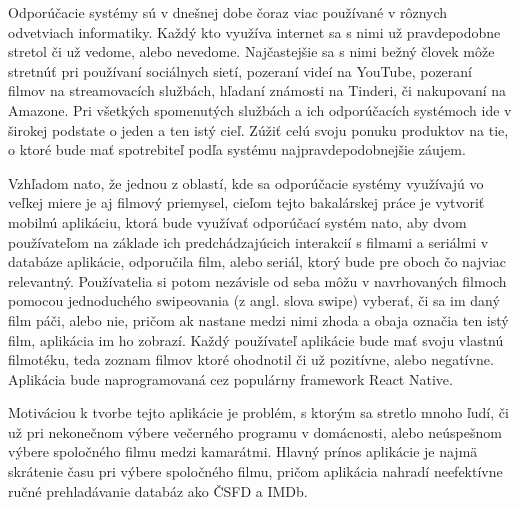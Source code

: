 
Odporúčacie systémy sú v dnešnej dobe čoraz viac používané v rôznych odvetviach informatiky. Každý kto využíva internet sa s nimi už pravdepodobne stretol či už vedome, alebo nevedome. Najčastejšie sa s nimi bežný človek môže stretnúť pri používaní sociálnych sietí, pozeraní videí na YouTube, pozeraní filmov na streamovacích službách, hľadaní známosti na Tinderi, či nakupovaní na Amazone. Pri všetkých spomenutých službách a ich odporúčacích systémoch ide v širokej podstate o jeden a ten istý cieľ. Zúžiť celú svoju ponuku produktov na tie, o ktoré bude mať spotrebiteľ podľa systému najpravdepodobnejšie záujem. \par
Vzhľadom nato, že jednou z oblastí, kde sa odporúčacie systémy využívajú vo veľkej miere je aj filmový priemysel, cieľom tejto bakalárskej práce je vytvoriť mobilnú aplikáciu, ktorá bude využívať odporúčací systém nato, aby dvom používateľom na základe ich predchádzajúcich interakcií s filmami a seriálmi v databáze aplikácie, odporučila film, alebo seriál, ktorý bude pre oboch čo najviac relevantný. Používatelia si potom nezávisle od seba môžu v navrhovaných filmoch pomocou jednoduchého swipeovania (z angl. slova swipe) vyberať, či sa im daný film páči, alebo nie, pričom ak nastane medzi nimi zhoda a obaja označia ten istý film, aplikácia im ho zobrazí. Každý používateľ aplikácie bude mať svoju vlastnú filmotéku, teda zoznam filmov ktoré ohodnotil či už pozitívne, alebo negatívne. Aplikácia bude naprogramovaná cez populárny framework React Native. \par
Motiváciou k tvorbe tejto aplikácie je problém, s ktorým sa stretlo mnoho ľudí, či už pri nekonečnom výbere večerného programu v domácnosti, alebo neúspešnom výbere spoločného filmu medzi kamarátmi. Hlavný prínos aplikácie je najmä skrátenie času pri výbere spoločného filmu, pričom aplikácia nahradí neefektívne ručné prehladávanie databáz ako ČSFD a IMDb. \par
